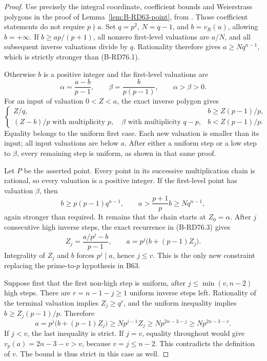 \begin{proof}
Use precisely the integral coordinate, coefficient bounds and
Weierstrass polygons in the proof of
Lemma~\ref{lem:B-RD63-point}, from
\cite[Proposition~5.7; (12.3)--(12.5); Proposition~12.10 and proof]
{HopkinsGross1994Bundles}. Those coefficient statements do not
require \(p\nmid a\). Set \(q=p^2\), \(N=q-1\), and
\(b=v_R(u)\), allowing \(b=+\infty\).
If \(b\ge ap/(p+1)\), all nonzero first-level valuations are
\(a/N\), and all subsequent inverse valuations divide by \(q\).
Rationality therefore gives \(a\ge Nq^{n-1}\), which is strictly
stronger than (B-RD76.1).

Otherwise \(b\) is a positive integer and the first-level
valuations are
\[
 \alpha=\frac{a-b}{p-1},\qquad
 \beta=\frac{b}{p(p-1)},\qquad \alpha>\beta>0.
                                                     \tag{B-RD76.2}
\]
For an input of valuation \(0<Z<a\), the exact inverse polygon
gives
\[
 \begin{cases}
 Z/q,& b\ge Z(p-1)/p,\\
 (Z-b)/p\text{ with multiplicity }p,
 \quad\beta\text{ with multiplicity }q-p,
      &b<Z(p-1)/p.
 \end{cases}                                         \tag{B-RD76.3}
\]
Equality belongs to the uniform first case. Each new valuation
is smaller than its input; all input valuations are below \(a\).
After either a uniform step or a low step to \(\beta\), every
remaining step is uniform, as shown in that same proof.

Let \(P\) be the asserted point. Every point in its successive
multiplication chain is rational, so every valuation is a
positive integer. If the first-level point has valuation
\(\beta\), then
\[
 b\ge p(p-1)q^{n-1},\qquad
 a>\frac{p+1}{p}b\ge Nq^{n-1},
\]
again stronger than required. It remains that the chain starts
at \(Z_0=\alpha\). After \(j\) consecutive high inverse steps,
the exact recurrence in (B-RD76.3) gives
\[
 Z_j=\frac{a/p^j-b}{p-1},\qquad
 a=p^j\bigl(b+(p-1)Z_j\bigr).
                                                     \tag{B-RD76.4}
\]
Integrality of \(Z_j\) and \(b\) forces \(p^j\mid a\), hence
\(j\le v\). This is the only new constraint replacing the
prime-to-\(p\) hypothesis in B63.

Suppose first that the first non-high step is uniform, after
\(j\le\min(v,n-2)\) high steps. There are
\(r=n-1-j\ge1\) uniform inverse steps left. Rationality of
the terminal valuation implies \(Z_j\ge q^r\), and the
uniform inequality implies \(b\ge Z_j(p-1)/p\). Therefore
\[
 a=p^j\bigl(b+(p-1)Z_j\bigr)
    \ge Np^{j-1}Z_j
    \ge Np^{2n-3-j}
    \ge Np^{2n-3-v}.                              \tag{B-RD76.5}
\]
If \(j<v\), the last inequality is strict. If \(j=v\),
equality throughout would give
\(v_p(a)=2n-3-v>v\), because \(v=j\le n-2\).
This contradicts the definition of \(v\). The bound is thus
strict in this case as well.


\end{proof}
